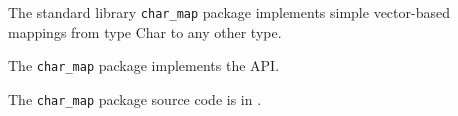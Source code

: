 
The standard library {\tt char\_map} package implements simple vector-based mappings 
from type Char to any other type.

The {\tt char\_map} package implements the  API.

The {\tt char\_map} package source code is in .



